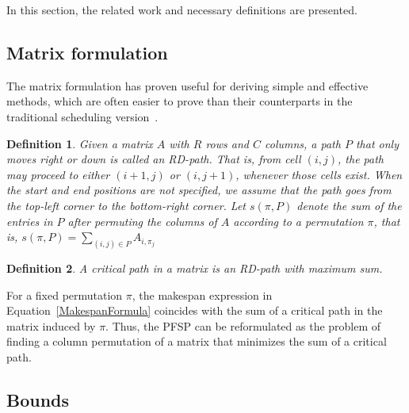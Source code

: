 \documentclass{article}
\theoremstyle{thmstyleone}%
\theoremstyle{thmstyletwo}%
\theoremstyle{thmstylethree}%
\newtheorem{definition}{Definition}%
\begin{document}
In this section, the related work and necessary definitions are presented. 

\subsection{Matrix formulation}

The matrix formulation has proven useful for deriving simple and effective methods, which are often easier to prove than their counterparts in the traditional scheduling version~\cite{MakespanDistribution, EfficientlySolvableCases}. 

\begin{definition}
Given a matrix $A$ with $R$ rows and $C$ columns, a path $P$ that only moves right or down 
is called an \textit{RD-path}. That is, from cell $(i,j)$, the path may proceed to either $(i + 1, j)$ or $(i, j + 1)$, whenever those cells exist. When the start and end positions are not specified, we assume that the path goes from the top-left corner to the bottom-right corner. Let $s(\pi, P)$ denote the sum of the entries in $P$ after permuting the columns of $A$ according to a permutation $\pi$, that is, $s(\pi, P) = \sum_{(i,j) \in P} A_{i,\pi_j}$
\end{definition}


\begin{definition}
A \textit{critical path} in a matrix is an RD-path with maximum sum.
\end{definition}

For a fixed permutation $\pi$, the makespan expression in Equation~\eqref{MakespanFormula} coincides with the sum of a critical path in the matrix induced by $\pi$. 
Thus, the PFSP can be reformulated as the problem of finding a column permutation of a matrix that minimizes the sum of a critical path.

\subsection{Bounds}
\end{document}
